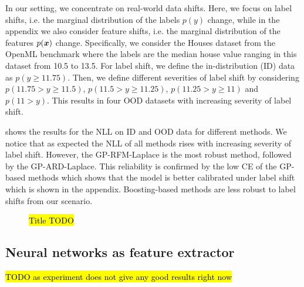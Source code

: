 In our setting, we concentrate on real-world data shifts.
Here, we focus on label shifts, i.e. the marginal distribution of the labels $p(y)$ change,
while in the appendix we also consider feature shifts, i.e. the marginal distribution of the features $p({\bm{x}})$ change.
Specifically, we consider the Houses dataset from the OpenML benchmark where the labels are the median house value ranging in this dataset from 10.5 to 13.5.
For label shift, we define the in-distribution (ID) data as $p(y\geq11.75)$.
Then, we define different severities of label shift by considering $p(11.75>y\geq11.5)$, $p(11.5>y\geq11.25)$, $p(11.25>y\geq11)$ and $p(11>y)$.
This results in four OOD datasets with increasing severity of label shift.

 shows the results for the NLL on ID and OOD data for different methods.
We notice that as expected the NLL of all methods rises with increasing severity of label shift.
However, the GP-RFM-Laplace is the most robust method, followed by the GP-ARD-Laplace.
This reliability is confirmed by the low CE of the GP-based methods which shows that the model is better calibrated under label shift which is shown in the appendix.
Boosting-based methods are less robust to label shifts from our scenario.


\begin{figure}
    \centering
    
    \caption{
        \hl{Title TODO}
        }
    \label{fig:ood-main_paper}
\end{figure}







\subsection{Neural networks as feature extractor}
\hl{TODO as experiment does not give any good results right now}

